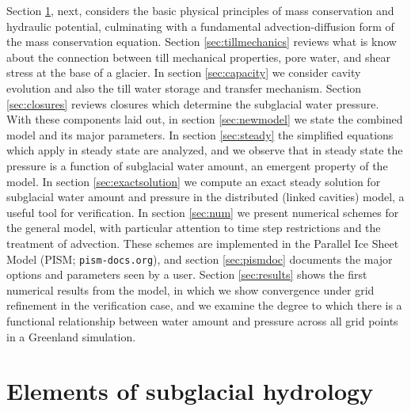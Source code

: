\documentclass[gmd]{copernicus}   %
\begin{document}
Section \ref{sec:elements}, next, considers the basic physical principles of mass conservation and hydraulic potential, culminating with a fundamental advection-diffusion form of the mass conservation equation.  Section \ref{sec:tillmechanics} reviews what is know about the connection between till mechanical properties, pore water, and shear stress at the base of a glacier.  In section \ref{sec:capacity} we consider cavity evolution and also the till water storage and transfer mechanism.  Section \ref{sec:closures} reviews closures which determine the subglacial water pressure.  With these components laid out, in section \ref{sec:newmodel} we state the combined model and its major parameters.  In section \ref{sec:steady} the simplified equations which apply in steady state are analyzed, and we observe that in steady state the pressure is a function of subglacial water amount, an emergent property of the model.  In section \ref{sec:exactsolution} we compute an exact steady solution for subglacial water amount and pressure in the distributed (linked cavities) model, a useful tool for verification.  In section \ref{sec:num} we present numerical schemes for the general model, with particular attention to time step restrictions and the treatment of advection.  These schemes are implemented in the Parallel Ice Sheet Model (PISM; \texttt{pism-docs.org}), and section \ref{sec:pismdoc} documents the major options and parameters seen by a user.  Section \ref{sec:results} shows the first numerical results from the model, in which we show convergence under grid refinement in the verification case, and we examine the degree to which there is a functional relationship between water amount and pressure across all grid points in a Greenland simulation.


\section{Elements of subglacial hydrology} \label{sec:elements}
\end{document}
